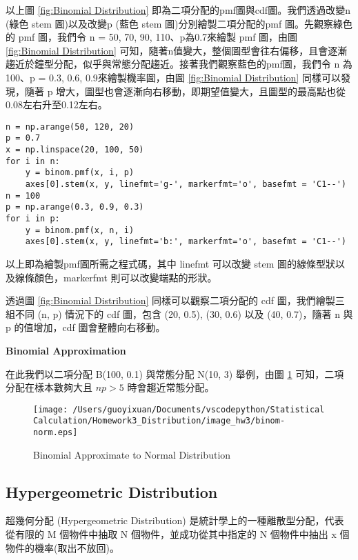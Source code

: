     以上圖 \ref{fig:Binomial Distribution} 即為二項分配的pmf圖與cdf圖。我們透過改變n (綠色 stem 圖)以及改變p (藍色 stem 圖)分別繪製二項分配的pmf 圖。先觀察綠色的  pmf 圖，我們令 n = 50, 70, 90, 110、p為0.7來繪製 pmf 圖，由圖 \ref{fig:Binomial Distribution} 可知，隨著n值變大，整個圖型會往右偏移，且會逐漸趨近於鐘型分配，似乎與常態分配趨近。接著我們觀察藍色的pmf圖，我們令 n 為100、p = 0.3, 0.6, 0.9來繪製機率圖，由圖 \ref{fig:Binomial Distribution} 同樣可以發現，隨著 p 增大，圖型也會逐漸向右移動，即期望值變大，且圖型的最高點也從0.08左右升至0.12左右。

\bigskip
\begin{lstlisting}
n = np.arange(50, 120, 20)
p = 0.7
x = np.linspace(20, 100, 50)
for i in n:
    y = binom.pmf(x, i, p)
    axes[0].stem(x, y, linefmt='g-', markerfmt='o', basefmt = 'C1--')
n = 100
p = np.arange(0.3, 0.9, 0.3)
for i in p:
    y = binom.pmf(x, n, i)
    axes[0].stem(x, y, linefmt='b:', markerfmt='o', basefmt = 'C1--')
\end{lstlisting}

以上即為繪製pmf圖所需之程式碼，其中 linefmt 可以改變 stem 圖的線條型狀以及線條顏色，markerfmt 則可以改變端點的形狀。

透過圖 \ref{fig:Binomial Distribution} 同樣可以觀察二項分配的 cdf 圖，我們繪製三組不同 (n, p) 情況下的 cdf 圖，包含 (20, 0.5), (30, 0.6) 以及 (40, 0.7)，隨著 n 與 p 的值增加，cdf 圖會整體向右移動。

\textbf{Binomial Approximation}

在此我們以二項分配 B(100, 0.1) 與常態分配 N(10, 3) 舉例，由圖 \ref{fig:Binomial Approximation} 可知，二項分配在樣本數夠大且 $np > 5$ 時會趨近常態分配。

\begin{figure}[H]
    \centering
        \texttt{[image: /Users/guoyixuan/Documents/vscodepython/Statistical Calculation/Homework3\_Distribution/image\_hw3/binom-norm.eps]}
    \caption{Binomial Approximate to Normal Distribution}
    \label{fig:Binomial Approximation}
\end{figure}


\subsection{Hypergeometric Distribution}

超幾何分配 (Hypergeometric Distribution) 是統計學上的一種離散型分配，代表從有限的 M 個物件中抽取 N 個物件，並成功從其中指定的 N 個物件中抽出 x 個物件的機率(取出不放回)。

